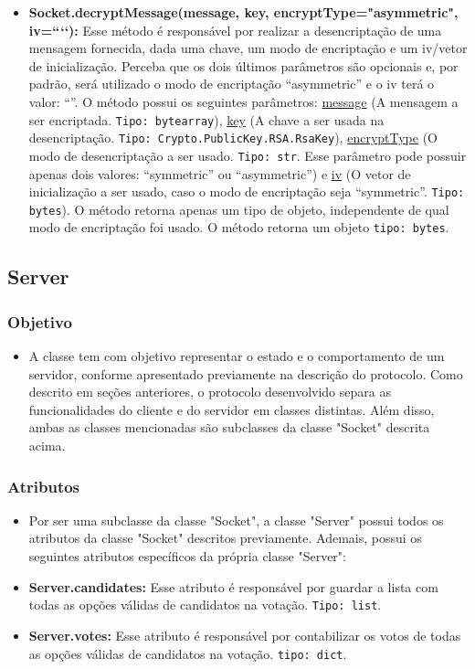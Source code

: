 \documentclass[10pt]{article}
\begin{document}
\begin{itemize}
\begin{itemize}
            \item \textbf{Socket.decryptMessage(message, key, encryptType="asymmetric", iv=“‘‘):} Esse método é responsável por realizar a desencriptação de uma mensagem fornecida, dada uma chave, um modo de encriptação e um iv/vetor de inicialização. Perceba que os dois últimos parâmetros são opcionais e, por padrão, será utilizado o modo de encriptação “asymmetric” e o iv terá o valor: “”. O método possui os seguintes parâmetros: \underline{message} (A mensagem a ser encriptada. \texttt{Tipo: bytearray}), \underline{key} (A chave a ser usada na desencriptação. \texttt{Tipo: Crypto.PublicKey.RSA.RsaKey}), \underline{encryptType} (O modo de desencriptação a ser usado. \texttt{Tipo: str}. Esse parâmetro pode possuir apenas dois valores: “symmetric” ou “asymmetric”) e \underline{iv} (O vetor de inicialização a ser usado, caso o modo de encriptação seja “symmetric”. \texttt{Tipo: bytes}). O método retorna apenas um tipo de objeto, independente de qual modo de encriptação foi usado. O método retorna um objeto \texttt{tipo: bytes}.
            
            \end{itemize}
        
    \subsection{\Large Server}
        \subsubsection{\large Objetivo}
            \begin{itemize}
            \item A classe tem com objetivo representar o estado e o comportamento de um servidor, conforme apresentado previamente na descrição do protocolo. Como descrito em seções anteriores, o protocolo desenvolvido separa as funcionalidades do cliente e do servidor em classes distintas. Além disso, ambas as classes mencionadas são subclasses da classe "Socket" descrita acima.
            \end{itemize}
        \subsubsection{\large Atributos}
            \begin{itemize}
            \item Por ser uma subclasse da classe "Socket", a classe "Server" possui todos os atributos da classe "Socket" descritos previamente. Ademais, possui os seguintes atributos específicos da própria classe "Server":
            \item \textbf{Server.candidates:}  Esse atributo é responsável por guardar a lista com todas as opções válidas de candidatos na votação. \texttt{Tipo: list}.
            \item \textbf{Server.votes:} Esse atributo é responsável por contabilizar os votos de todas as opções válidas de candidatos na votação. \texttt{tipo: dict}.
            \end{itemize}

\end{itemize}
\end{document}
